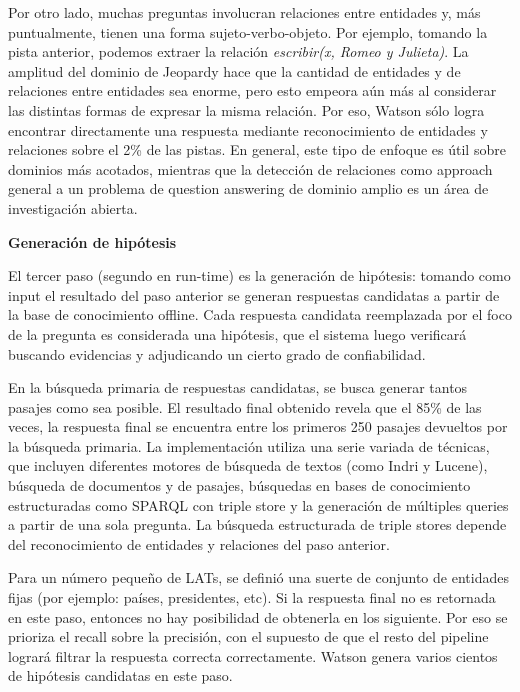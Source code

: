 Por otro lado, muchas preguntas involucran relaciones entre entidades y,
más puntualmente, tienen una forma sujeto-verbo-objeto. Por ejemplo,
tomando la pista anterior, podemos extraer la relación
\textit{escribir(x, Romeo y Julieta)}. La amplitud del dominio de
Jeopardy hace que la cantidad de entidades y de relaciones entre
entidades sea enorme, pero esto empeora aún más al considerar las
distintas formas de expresar la misma relación. Por eso, Watson
sólo logra encontrar directamente una respuesta mediante
reconocimiento de entidades y relaciones sobre el 2\% de las pistas. En
general, este tipo de enfoque es útil sobre dominios más acotados,
mientras que la detección de relaciones como approach general a un
problema de question answering de dominio amplio es un área de
investigación abierta.

\medskip

\textbf{Generación de hipótesis}\newline

El tercer paso (segundo en run-time) es la generación de hipótesis:
tomando como input el resultado del paso anterior se generan respuestas
candidatas a partir de la base de conocimiento offline. Cada respuesta
candidata reemplazada por el foco de la pregunta es considerada una
hipótesis, que el sistema luego verificará buscando evidencias y
adjudicando un cierto grado de confiabilidad.

En la búsqueda primaria de respuestas candidatas, se busca generar
tantos pasajes como sea posible. El resultado final obtenido revela que
el 85\% de las veces, la respuesta final se encuentra entre los
primeros 250 pasajes devueltos por la búsqueda primaria. La
implementación utiliza una serie variada de técnicas, que incluyen
diferentes motores de búsqueda de textos (como Indri y Lucene),
búsqueda de documentos y de pasajes, búsquedas en bases de
conocimiento estructuradas como SPARQL con triple store y la
generación de múltiples queries a partir de una sola pregunta. La
búsqueda estructurada de triple stores depende del reconocimiento de
entidades y relaciones del paso anterior.

Para un número pequeño de LATs, se definió una suerte de conjunto
de entidades fijas (por ejemplo: países, presidentes, etc). Si la
respuesta final no es retornada en este paso, entonces no hay
posibilidad de obtenerla en los siguiente. Por eso se prioriza el
recall sobre la precisión, con el supuesto de que el resto del
pipeline logrará filtrar la respuesta correcta correctamente. Watson
genera varios cientos de hipótesis candidatas en este paso. \newline

